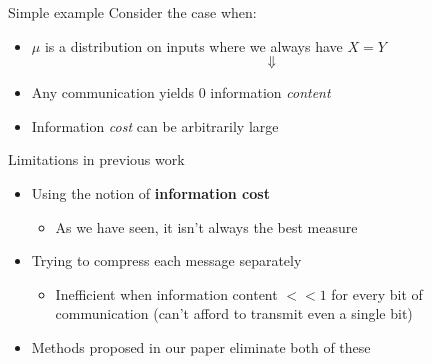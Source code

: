 \documentclass[10pt]{beamer}
\begin{document}
\begin{frame}{Simple example}
Consider the case when:
\begin{itemize}
    \item $\mu$ is a distribution on inputs where we always have $X = Y$
        \pause
    $$ \Downarrow $$
    \item Any communication yields 0 information \textit{content}
    \vskip 0.6cm
    \item Information \textit{cost} can be arbitrarily large
\end{itemize}
\end{frame}

\begin{frame}{Limitations in previous work}
\begin{itemize}
    \pause
    \item Using the notion of \textbf{information cost}
    \begin{itemize}
        \item As we have seen, it isn't always the best measure
    \end{itemize}
    \vskip 0.6cm
        \pause
    \item Trying to compress each message separately
    \begin{itemize}
        \item Inefficient when information content $<< 1$ for every bit of communication (can't afford to transmit even a single bit)
    \end{itemize}
        \pause
    \vskip 1.4cm
    \item Methods proposed in our paper eliminate both of these
\end{itemize}
\end{frame}
\end{document}
